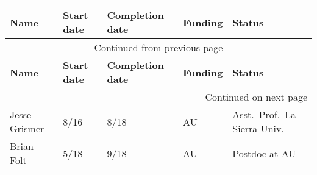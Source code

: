 {\sffamily\small
\begin{longtable}[l]{ @{} p{1.2in} p{0.5in} p{0.7in} p{0.7in} p{2.5in} @{} }
    \hline
    \textbf{Name} & \textbf{Start date} & \textbf{Completion date} & \textbf{Funding} & \textbf{Status} \\
    \hline
    \endfirsthead
    \multicolumn{5}{c}{{Continued from previous page}} \\
    \hline
    \textbf{Name} & \textbf{Start date} & \textbf{Completion date} & \textbf{Funding} & \textbf{Status} \\
    \hline
    \endhead
    \hline \multicolumn{5}{r}{{Continued on next page}} \\
    \endfoot
    \hline
    \endlastfoot
    Jesse Grismer & 8/16 & 8/18 & AU & Asst.\ Prof.\, La Sierra Univ. \\
    Brian Folt & 5/18 & 9/18 & AU & Postdoc at AU \\
\end{longtable}
}
